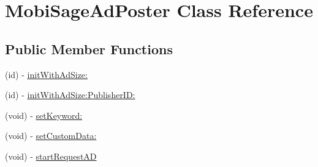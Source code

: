 \hypertarget{interface_mobi_sage_ad_poster}{\section{\-Mobi\-Sage\-Ad\-Poster \-Class \-Reference}
\label{interface_mobi_sage_ad_poster}
}
\subsection*{\-Public \-Member \-Functions}
\begin{DoxyCompactItemize}
\item 
(id) -\/ \hyperlink{interface_mobi_sage_ad_poster_abab38207707aaa6e80cfbf6500cdb45d}{init\-With\-Ad\-Size\-:}
\item 
(id) -\/ \hyperlink{interface_mobi_sage_ad_poster_a0bdb1bbd765b7ae58539d9b69dc4c4f7}{init\-With\-Ad\-Size\-:\-Publisher\-I\-D\-:}
\item 
(void) -\/ \hyperlink{interface_mobi_sage_ad_poster_a2f6b7f0932f25910f29072ab15d36f4a}{set\-Keyword\-:}
\item 
(void) -\/ \hyperlink{interface_mobi_sage_ad_poster_a0eec34f7b5bf221c0a7179e62ec6e8c8}{set\-Custom\-Data\-:}
\item 
(void) -\/ \hyperlink{interface_mobi_sage_ad_poster_a0db33f6ba5c2baf4260d3c7984e5e856}{start\-Request\-A\-D}
\end{DoxyCompactItemize}


